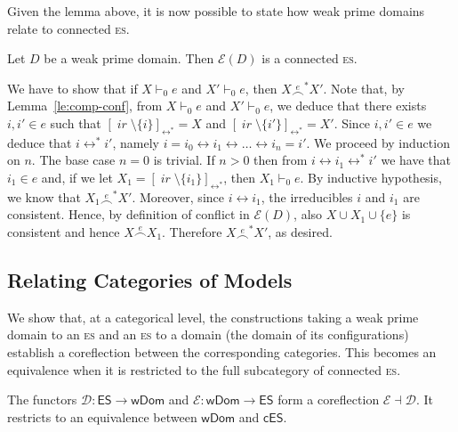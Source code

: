 \documentclass[conference]{IEEEtran}
\renewenvironment{proof}{\begin{IEEEproof}}{\end{IEEEproof}}
\newcommand{\ir}[1]{\ensuremath{\mathop{\mathit{ir}({#1})}}}
\newcommand{\esabbr}{\textsc{es}}
\newcommand{\eqclass}[2][]{\ensuremath{[{#2}]_{\scriptscriptstyle {#1}}}}
\newcommand{\eqclassir}[1]{\ensuremath{\eqclass[\leftrightarrow^*]{#1}}}
\newcommand{\es}{\ensuremath{\mathsf{ES}}}
\newcommand{\ces}{\ensuremath{\mathsf{cES}}}
\newcommand{\WDom}{\ensuremath{\mathsf{wDom}}}
\newcommand{\zev}[0]{\ensuremath{\mathcal{E}}}
\newcommand{\ev}[1]{\ensuremath{\zev({#1})}}
\newcommand{\conn}[1]{\ensuremath{\stackrel{#1}{\frown}}}
\newcommand{\zdom}[0]{\ensuremath{\mathcal{D}}}
\begin{document}
Given the lemma above, it is now possible to state how weak prime 
domains relate to connected {\esabbr}.

\begin{proposition}
  \label{pr:domain-to-fes}
  Let  $D$ be a weak prime domain. Then $\ev{D}$ is a connected {\esabbr}.
\end{proposition}

\begin{proof}
  We have to show that
  if $X \vdash_0 e$ and $X' \vdash_0 e$, then $X \conn{e}^* X'$.  Note
  that, by Lemma~\ref{le:comp-conf}, 
  from $X \vdash_0 e$ and
  $X' \vdash_0 e$, we deduce that there exists $i, i' \in e$ such that
  $\eqclassir{\ir{i} \setminus \{i\}} = X$ and
  $\eqclassir{\ir{i'} \setminus \{i'\}} = X'$. Since $i, i' \in e$ we
  deduce that $i \leftrightarrow^* i'$, namely
  $i = i_0 \leftrightarrow i_1 \leftrightarrow \ldots \leftrightarrow
  i_n = i'$. We proceed by induction on $n$. The base case $n=0$ is
  trivial. If $n >0$ then from
  $i \leftrightarrow i_1 \leftrightarrow^* i'$ we have that
  $i_1 \in e$ and, if we let
  $X_1 = \eqclassir{\ir{i_1} \setminus \{i_1\}}$, then
  $X_1 \vdash_0 e$. By inductive hypothesis, we know that
  $X_1 \conn{e}^* X'$. Moreover, since $i \leftrightarrow i_1$,
  the irreducibles $i$ and $i_1$ are consistent. Hence, by definition
  of conflict in $\ev{D}$, also $X \cup X_1 \cup \{e\}$ is consistent
  and hence $X \conn{e} X_1$. Therefore $X \conn{e}^* X'$, as desired.
\end{proof}



\subsection{Relating Categories of Models}
\label{ss:relating-cats}
We show that, at a categorical level, the constructions taking a weak prime domain to an
{\esabbr} and an {\esabbr} to a domain (the domain of its configurations) establish
a coreflection between the corresponding categories.
%
This becomes an equivalence when it is restricted to the full subcategory of connected {\esabbr}.

\begin{theorem}[coreflection of $\es$ and $\WDom$]
 \label{th:es-dom-equivalence}
 The functors $\zdom : \es \to \WDom$ and $\zev: \WDom \to \es$ form
 a coreflection $\zev \dashv \zdom$.  It restricts to an equivalence between $\WDom$ and
 $\ces$.
\end{theorem}
\end{document}
